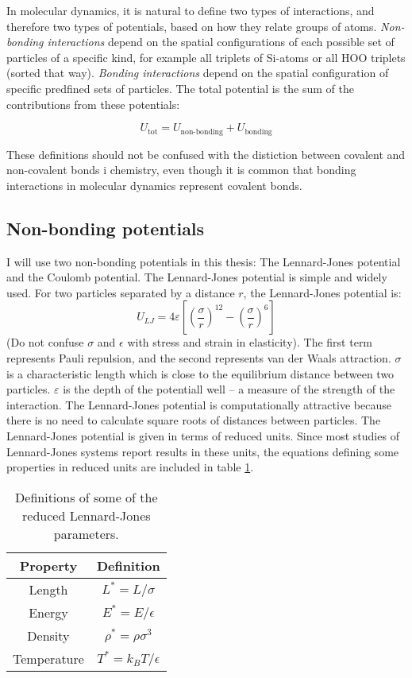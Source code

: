 In molecular dynamics, it is natural to define two types of interactions, and therefore two types of potentials, based on how they relate groups of atoms. \emph{Non-bonding interactions} depend on the spatial configurations of each possible set of particles of a specific kind, for example all triplets of Si-atoms or all HOO triplets (sorted that way). \emph{Bonding interactions} depend on the spatial configuration of specific predfined sets of particles. The total potential is the sum of the contributions from these potentials: 

\begin{equation}
	U_{\text{tot}} = U_{\text{non-bonding}} + U_{\text{bonding}} 
\end{equation}

These definitions should not be confused with the distiction between covalent and non-covalent bonds i chemistry, even though it is common that bonding interactions in molecular dynamics represent covalent bonds.

\subsection{Non-bonding potentials}
\label{sec:non_bonding_potentials}
I will use two non-bonding potentials in this thesis: The Lennard-Jones potential and the Coulomb potential.
The Lennard-Jones potential is simple and widely used. For two particles separated by a distance $r$, the Lennard-Jones potential is:
\begin{equation}
	U_{LJ} = 4\varepsilon\left[\left(\frac{\sigma}{r}\right)^{12} - \left(\frac{\sigma}{r}\right)^{6}\right]
\end{equation}
(Do not confuse $\sigma$ and $\epsilon$ with stress and strain in elasticity).
The first term represents Pauli repulsion, and the second represents van der Waals attraction. $\sigma$ is a characteristic length which is close to the equilibrium distance between two particles. $\varepsilon$ is the depth of the potentiall well -- a measure of the strength of the interaction. The Lennard-Jones potential is computationally attractive because there is no need to calculate square roots of distances between particles. The Lennard-Jones potential is given in terms of reduced units. Since most studies of Lennard-Jones systems report results in these units, the equations defining some properties in reduced units are included in table \ref{tbl:lj_parameters}.

\begin{table}
\centering
\caption{Definitions of some of the reduced Lennard-Jones parameters.}
\label{tbl:lj_parameters}
\begin{tabular}{c|c}
\textbf{Property} & \textbf{Definition} \\
\hline
Length & $L^* = L/\sigma$ \\
Energy & $E^* = E/\epsilon$ \\
Density & $\rho^* = \rho \sigma^3$ \\
Temperature & $T^* = k_BT/\epsilon$ \\
\end{tabular}
\end{table} 

